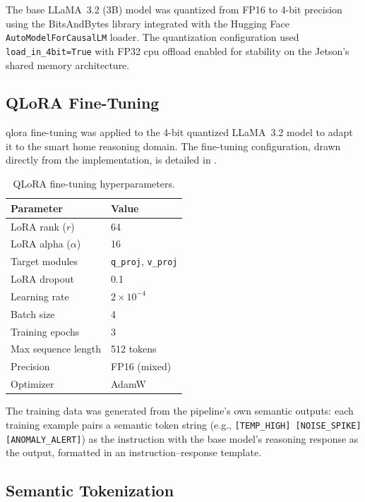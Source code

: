 \documentclass[12pt,a4paper,oneside]{report}
\begin{document}
The base LLaMA~3.2 (3B) model was quantized from FP16 to 4-bit precision using the BitsAndBytes library integrated with the Hugging Face \texttt{AutoModelForCausalLM} loader. The quantization configuration used \texttt{load\_in\_4bit=True} with FP32 \gls{cpu} offload enabled for stability on the Jetson's shared memory architecture.

\subsection{QLoRA Fine-Tuning}

\gls{qlora} fine-tuning was applied to the 4-bit quantized LLaMA~3.2 model to adapt it to the smart home reasoning domain. The fine-tuning configuration, drawn directly from the implementation, is detailed in .

\begin{table}[htbp]
\caption{QLoRA fine-tuning hyperparameters.}
\label{tab:qlora-config}
\centering
\begin{tabular}{ll}
\toprule
\textbf{Parameter} & \textbf{Value} \\
\midrule
LoRA rank ($r$)          & 64 \\
LoRA alpha ($\alpha$)    & 16 \\
Target modules           & \texttt{q\_proj}, \texttt{v\_proj} \\
LoRA dropout             & 0.1 \\
Learning rate            & $2 \times 10^{-4}$ \\
Batch size               & 4 \\
Training epochs          & 3 \\
Max sequence length      & 512 tokens \\
Precision                & FP16 (mixed) \\
Optimizer                & AdamW \\
\bottomrule
\end{tabular}
\end{table}

The training data was generated from the pipeline's own semantic outputs: each training example pairs a semantic token string (e.g., \texttt{[TEMP\_HIGH] [NOISE\_SPIKE] [ANOMALY\_ALERT]}) as the instruction with the base model's reasoning response as the output, formatted in an instruction--response template.

\subsection{Semantic Tokenization}
\end{document}

